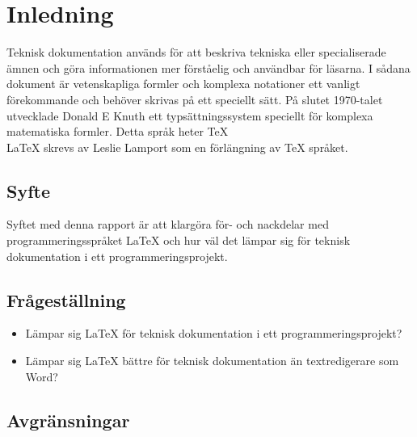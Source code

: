 \section{Inledning}
Teknisk dokumentation används för att beskriva tekniska eller specialiserade ämnen och göra informationen mer förståelig och användbar för läsarna. I sådana dokument är vetenskapliga formler och komplexa notationer ett vanligt förekommande och behöver skrivas på ett speciellt sätt. 
\newline
\newline
På slutet 1970-talet utvecklade Donald E Knuth ett typsättningssystem speciellt för komplexa matematiska formler. Detta språk heter {\TeX}
\\
{\LaTeX} skrevs av Leslie Lamport som en förlängning av {\TeX} språket.  

\subsection{Syfte}
Syftet med denna rapport är att klargöra för- och nackdelar med programmeringsspråket {\LaTeX} och hur väl det lämpar sig för teknisk dokumentation i ett programmeringsprojekt. 

\subsection{Frågeställning}
\begin{itemize}
\item Lämpar sig {\LaTeX} för teknisk dokumentation i ett programmeringsprojekt? 
\item Lämpar sig {\LaTeX} bättre för teknisk dokumentation än textredigerare som Word? 
\end{itemize}
		
\subsection{Avgränsningar}


	